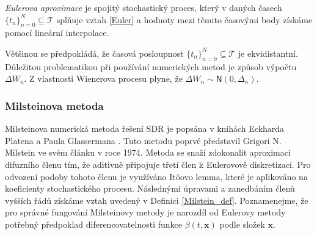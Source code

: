 \documentclass[a4paper,12pt]{report}
\theoremstyle{definition} \newtheorem{definice}[veta]{Definice}
\theoremstyle{remark}
\begin{document}
\textit{Eulerova aproximace} je spojitý stochastický proces, který v daných časech $\{t_n\}_{n=0}^N\subseteq \mathcal{T}$ splňuje vztah \eqref{Euler} a hodnoty mezi těmito časovými body získáme pomocí lineární interpolace.

Většinou se předpokládá, že časová posloupnost $\{t_n\}_{n=0}^N\subseteq \mathcal{T}$ je ekvidistantní. 
Důležitou problematikou při používání numerických metod je způsob výpočtu $\Delta W_n$.
Z vlastnosti Wienerova procesu plyne, že $\Delta W_n\sim\mathsf{N}(0, \Delta_n)$.

\subsubsection{Milsteinova metoda}
Milsteinova numerická metoda řešení SDR je popsána v knihách Eckharda Platena \cite{platen2010numerical} a Paula Glassermana \cite{glasserman2003monte}.
Tuto metodu poprvé představil Grigori N. Milstein ve svém článku \cite{milstein1974approximate} v roce 1974.
Metoda se snaží zdokonalit aproximaci difuzního členu tím, že aditivně připojuje třetí člen k Eulerovově diskretizaci.
Pro odvození podoby tohoto členu je využíváno  It\^oovo lemma, které je aplikováno na koeficienty stochastického procesu.
Následnými úpravami a zanedbáním členů vyšších řádů získáme vztah uvedený v Definici \ref{Milstein_def}.
Poznamenejme, že pro správné fungování Milsteinovy metody je narozdíl od Eulerovy metody potřebný předpoklad diferencovatelnosti funkce $\beta(t,\boldsymbol{x})$ podle složek $\boldsymbol{x}$.
\end{document}
